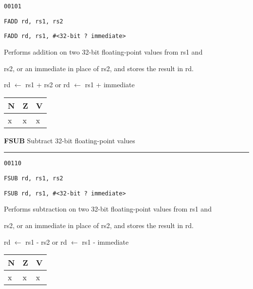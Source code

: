 \documentclass{article}
\begin{document}
{\large
	 \texttt{00101} \par
	\smallbreak
	 \texttt{FADD rd, rs1, rs2} \par
	\smallbreak
	 \texttt{FADD rd, rs1, \#<32-bit ? immediate>} \par
	\smallbreak
	 Performs addition on two 32-bit floating-point values from rs1 and \par
	\makebox[3.5cm][l]{  } rs2, or an immediate in place of rs2, and stores the result in rd. \par
	\smallbreak
	 rd $\leftarrow$ rs1 + rs2 \quad or \quad rd $\leftarrow$ rs1 + immediate\par
	\smallbreak
	 \begin{tabular}{lll} N \quad & Z \quad & V \\ \hline x & x & x \\ \end{tabular}
}

\bigskip\bigskip

\flushleft
\LARGE\textbf{FSUB} \large \hfill Subtract 32-bit floating-point values

\kern-3pt
\noindent\rule{16.5cm}{0.4pt}
\normalsize

{\large
	 \texttt{00110} \par
	\smallbreak
	 \texttt{FSUB rd, rs1, rs2} \par
	\smallbreak
	 \texttt{FSUB rd, rs1, \#<32-bit ? immediate>} \par
	\smallbreak
	 Performs subtraction on two 32-bit floating-point values from rs1 and \par
	\makebox[3.5cm][l]{  } rs2, or an immediate in place of rs2, and stores the result in rd. \par
	\smallbreak
	 rd $\leftarrow$ rs1 - rs2 \quad or \quad rd $\leftarrow$ rs1 - immediate\par
	\smallbreak
	 \begin{tabular}{lll} N \quad & Z \quad & V \\ \hline x & x & x \\ \end{tabular}
}

\bigskip\bigskip
\end{document}
